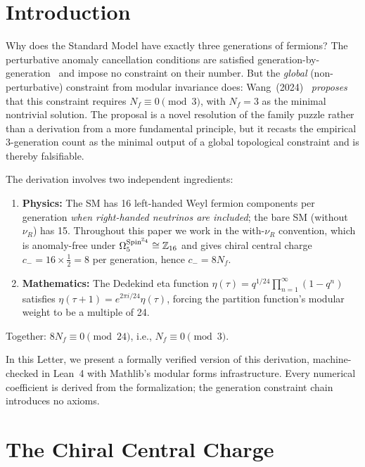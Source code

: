 \documentclass[aps,prl,twocolumn,superscriptaddress]{revtex4-2}
\begin{document}
\section{Introduction}

Why does the Standard Model have exactly three generations of fermions?
The perturbative anomaly cancellation conditions are satisfied
generation-by-generation~\cite{GrossJackiw1972} and impose no constraint
on their number. But the \emph{global} (non-perturbative) constraint
from modular invariance does: Wang~(2024)~\cite{Wang2024}
\emph{proposes} that this constraint requires
$N_f \equiv 0 \pmod{3}$, with $N_f = 3$ as the minimal nontrivial
solution. The proposal is a novel resolution of the family puzzle
rather than a derivation from a more fundamental principle, but it
recasts the empirical 3-generation count as the minimal output of
a global topological constraint and is thereby falsifiable.

The derivation involves two independent ingredients:
\begin{enumerate}
\item \textbf{Physics:} The SM has 16 left-handed Weyl fermion components
per generation \emph{when right-handed neutrinos are included}; the
bare SM (without $\nu_R$) has 15. Throughout this paper we work in
the with-$\nu_R$ convention, which is anomaly-free under $\Omega_5^{\rm
Spin^{\mathbb{Z}_4}} \cong \mathbb{Z}_{16}$ and gives chiral central charge
$c_- = 16 \times \tfrac{1}{2} = 8$ per generation, hence $c_- = 8 N_f$.
\item \textbf{Mathematics:} The Dedekind eta function
$\eta(\tau) = q^{1/24}\prod_{n=1}^\infty(1-q^n)$ satisfies
$\eta(\tau+1) = e^{2\pi i/24}\eta(\tau)$, forcing the partition function's
modular weight to be a multiple of 24.
\end{enumerate}
Together: $8 N_f \equiv 0 \pmod{24}$, i.e., $N_f \equiv 0 \pmod{3}$.

In this Letter, we present a formally verified version of this
derivation, machine-checked in Lean~4 with Mathlib's modular forms
infrastructure. Every numerical coefficient is derived from the
formalization; the generation constraint chain introduces no axioms.

\section{The Chiral Central Charge}
\label{sec:central_charge}
\end{document}
